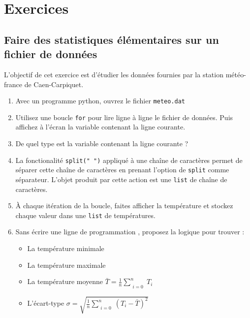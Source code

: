 
\section{Exercices}

\subsection{Faire des statistiques élémentaires sur un fichier de données}

L'objectif de cet exercice est d'étudier les données fournies par la station météo-france
de Caen-Carpiquet.
\begin{enumerate}
\item Avec un programme python, ouvrez le fichier \texttt{meteo.dat}

\item Utilisez une boucle \texttt{for} pour lire ligne à ligne le fichier de données.
  Puis affichez à l'écran la variable contenant la ligne courante.

\item De quel type est la variable contenant la ligne courante ?

\item La fonctionalité \texttt{split(" ")} appliqué à une chaîne de caractères permet de
  séparer cette chaîne de caractères en prenant l'option de \texttt{split} comme séparateur.
  L'objet produit par cette action est une \texttt{list} de chaîne de caractères.

\item À chaque itération de la boucle, faites afficher la température et stockez chaque valeur dans une \texttt{list} de températures.

\item Sans écrire une ligne de programmation , proposez la logique pour trouver :
  \begin{itemize}
  \item La température minimale
  \item La température maximale
  \item La température moyenne    $ \bar{T}= \frac{1}{n}  \sum\limits_{\substack{i=0}}^{n}{T_i}$
  \item L'écart-type  $\sigma = \sqrt{\frac{1}{n}  \sum\limits_{\substack{i=0}}^{n}{} (T_i-\bar{T})^2   }$
  \end{itemize}


\end{enumerate}
